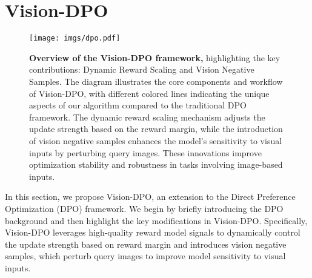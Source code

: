 
\section{Vision-DPO}
\begin{figure*}
    \centering
    \texttt{[image: imgs/dpo.pdf]}
    \caption{\textbf{Overview of the Vision-DPO framework,} highlighting the key contributions: Dynamic Reward Scaling and Vision Negative Samples. The diagram illustrates the core components and workflow of Vision-DPO, with different colored lines indicating the unique aspects of our algorithm compared to the traditional DPO framework. The dynamic reward scaling mechanism adjusts the update strength based on the reward margin, while the introduction of vision negative samples enhances the model's sensitivity to visual inputs by perturbing query images. These innovations improve optimization stability and robustness in tasks involving image-based inputs.}
    \label{fig:dpo_alg}
\end{figure*}
In this section, we propose Vision-DPO, an extension to the Direct Preference Optimization (DPO) framework. We begin by briefly introducing the DPO background and then highlight the key modifications in Vision-DPO. Specifically, Vision-DPO leverages high-quality reward model signals to dynamically control the update strength based on reward margin and introduces vision negative samples, which perturb query images to improve model sensitivity to visual inputs. 
